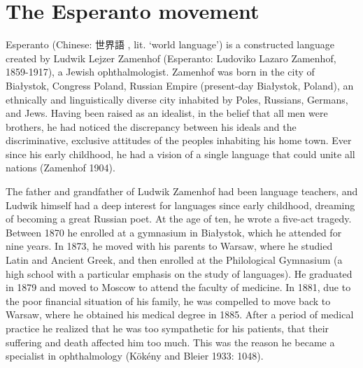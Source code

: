 \section{The Esperanto movement}

Esperanto (Chinese: 世界語 , lit. `world language') is a constructed language created by Ludwik Lejzer Zamenhof (Esperanto: Ludoviko Lazaro Zamenhof, 1859-1917), a Jewish ophthalmologist.
Zamenhof was born in the city of Białystok, Congress Poland, Russian Empire (present-day Białystok, Poland), an ethnically and linguistically diverse city inhabited by Poles, Russians, Germans, and Jews.
Having been raised as an idealist, in the belief that all men were brothers, he had noticed the discrepancy between his ideals and the discriminative, exclusive attitudes of the peoples inhabiting his home town.
Ever since his early childhood, he had a vision of a single language that could unite all nations (Zamenhof 1904).

The father and grandfather of Ludwik Zamenhof had been language teachers, and Ludwik himself had a deep interest for languages since early childhood, dreaming of becoming a great Russian poet.
At the age of ten, he wrote a five-act tragedy.
Between 1870 he enrolled at a gymnasium in Białystok, which he attended for nine years.
In 1873, he moved with his parents to Warsaw, where he studied Latin and Ancient Greek, and then enrolled at the Philological Gymnasium (a high school with a particular emphasis on the study of languages).
He graduated in 1879 and moved to Moscow to attend the faculty of medicine.
In 1881, due to the poor financial situation of his family, he was compelled to move back to Warsaw, where he obtained his medical degree in 1885.
After a period of medical practice he realized that he was too sympathetic for his patients, that their suffering and death affected him too much.
This was the reason he became a specialist in ophthalmology
(Kökény and Bleier 1933: 1048).

